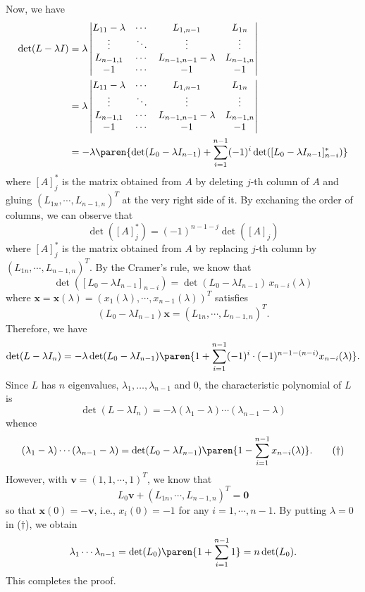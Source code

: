 \documentclass{homework}
\begin{document}
{Now, we have
\begin{align*}
    \det(L-\lambda I) & = \lambda\begin{vmatrix}
        L_{11} - \lambda & \cdots & L_{1,n-1}              & L_{1n}    \\
        \vdots           & \ddots & \vdots                 & \vdots    \\
        L_{n-1,1}        & \cdots & L_{n-1,n-1}  - \lambda & L_{n-1,n} \\
        - 1              & \cdots & -1                     & - 1       \\
    \end{vmatrix}
    \\&= \lambda\begin{vmatrix}
        L_{11} - \lambda & \cdots & L_{1,n-1}             & L_{1n}    \\
        \vdots           & \ddots & \vdots                & \vdots    \\
        L_{n-1,1}        & \cdots & L_{n-1,n-1} - \lambda & L_{n-1,n} \\
        - 1              & \cdots & -1                    & - 1       \\
    \end{vmatrix}
    \\ &= -\lambda\paren{ \det(L_0 - \lambda I_{n-1}) + \sum_{i=1}^{n-1} (-1)^{i} \det([L_0 - \lambda I_{n-1}]_{n-i}^*)  }
\end{align*}
where $[A]_j^*$ is the matrix obtained from $A$ by deleting $j$-th column of $A$ and gluing $(L_{1n},\cdots, L_{n-1,n})^T$ at the very right side of it. By exchaning the order of columns, we can observe that
\[ \det([A]_j^*) = (-1)^{n-1-j}\det([A]_j) \]
where $[A]_j^*$ is the matrix obtained from $A$ by replacing $j$-th column by $(L_{1n},\cdots, L_{n-1,n})^T$.
By the Cramer's rule, we know that
\[  \det([L_0 - \lambda I_{n-1}]_{n-i}) = \det(L_0 - \lambda I_{n-1})\,x_{n-i}(\lambda) \]
where $\mathbf x = \mathbf x(\lambda) = (x_1(\lambda),\cdots,x_{n-1}(\lambda))^T$ satisfies
\[ (L_0 - \lambda I_{n-1})\mathbf x = (L_{1n},\cdots, L_{n-1,n})^T. \]
Therefore, we have
\[ \det(L - \lambda I_n) = -\lambda \det(L_0 - \lambda I_{n-1}) \paren{ 1 + \sum_{i=1}^{n-1} (-1)^i \cdot (-1)^{n-1-(n-i)} x_{n-i}(\lambda) }. \]
Since $L$ has $n$ eigenvalues, $\lambda_1,\dots,\lambda_{n-1}$ and 0, the characteristic polynomial of $L$ is
\[ \det(L - \lambda I_n) = -\lambda (\lambda_1-\lambda)\cdots (\lambda_{n-1}-\lambda) \]
whence
\[ (\lambda_1-\lambda)\cdots (\lambda_{n-1}-\lambda) = \det(L_0 - \lambda I_{n-1}) \paren{ 1 - \sum_{i=1}^{n-1}  x_{n-i}(\lambda) }. \tag{$\dagger$} \]
However, with $\mathbf v = (1,1,\cdots, 1)^T$, we know that
\[ L_0\mathbf v + (L_{1n},\cdots, L_{n-1,n})^T = \mathbf 0 \]
so that $\mathbf x(0) = -\mathbf v$, i.e., $x_i(0) = -1$ for any $i=1,\cdots,n-1$.
By putting $\lambda=0$ in ($\dagger$), we obtain
\[ \lambda_1\cdots \lambda_{n-1}= \det(L_0) \paren{ 1 + \sum_{i=1}^{n-1}1 } = n\det(L_0).\]
This completes the proof.
}
\end{document}
